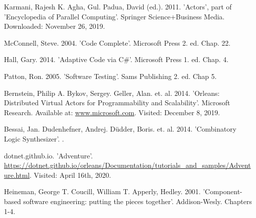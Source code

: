 \begin{thebibliography}{9}
Karmani, Rajesh K. Agha, Gul. Padua, David (ed.). 2011. 'Actors', part of 'Encyclopedia of Parallel Computing'. Springer Science+Business Media. Downloaded: November 26, 2019.

McConnell, Steve. 2004. 'Code Complete'. Microsoft Press 2. ed. Chap. 22.

Hall, Gary. 2014. 'Adaptive Code via C\#'. Microsoft Press 1. ed. Chap. 4.

Patton, Ron. 2005. 'Software Testing'. Sams Publishing 2. ed. Chap 5.

Bernstein, Philip A. Bykov, Sergey. Geller, Alan. et. al. 2014. 'Orleans: Distributed Virtual Actors for Programmability and Scalability'. Microsoft Research. Available at: \url{www.microsoft.com}. Visited: December 8, 2019.

Bessai, Jan. Dudenhefner, Andrej. Düdder, Boris. et. al. 2014. 'Combinatory Logic Synthesizer'. .

dotnet.github.io. 'Adventure'. \url{https://dotnet.github.io/orleans/Documentation/tutorials_and_samples/Adventure.html}. Visited: April 16th, 2020.

Heineman, George T. Coucill, William T. Apperly, Hedley. 2001. 'Component-based software engineering: putting the pieces together'. Addison-Wesly. Chapters 1-4.
\end{thebibliography}